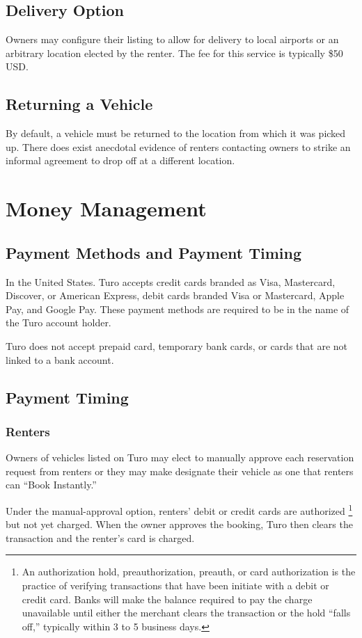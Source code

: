 \documentclass[review,12pt]{elsarticle}
\begin{document}
  \subsection{Delivery Option}
  Owners may configure their listing to allow for delivery to local airports or an arbitrary location elected by the renter. The fee for this service is typically \$50 USD.

  \subsection{Returning a Vehicle}
  By default, a vehicle must be returned to the location from which it was picked up. There does exist anecdotal evidence of renters contacting owners to strike an informal agreement to drop off at a different location.

\section{Money Management}

  \subsection{Payment Methods and Payment Timing}
  In the United States. Turo accepts credit cards branded as Visa, Mastercard, Discover, or American Express, debit cards branded Visa or Mastercard, Apple Pay, and Google Pay. These payment methods are required to be in the name of the Turo account holder.

  Turo does not accept prepaid card, temporary bank cards, or cards that are not linked to a bank account.
  \subsection{Payment Timing}\label{timing}
    \subsubsection{Renters}
    Owners of vehicles listed on Turo may elect to manually approve each reservation request from renters or they may make designate their vehicle as one that renters can ``Book Instantly.''

    Under the manual-approval option, renters' debit or credit cards are authorized
    \footnote{An authorization hold, preauthorization, preauth, or card authorization is the practice of verifying transactions that have been initiate with a debit or credit card. Banks will make the balance required to pay the charge unavailable until either the merchant clears the transaction or the hold ``falls off,'' typically within 3 to 5 business days.
    }
    but not yet charged. When the owner approves the booking, Turo then clears the transaction and the renter's card is charged.
\end{document}
